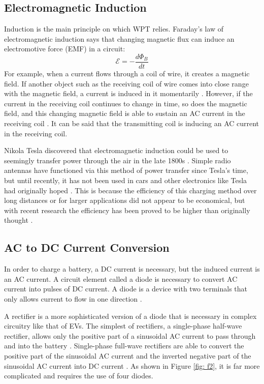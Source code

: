 \subsection{Electromagnetic Induction}
Induction is the main principle on which WPT relies. Faraday’s law of electromagnetic induction says that changing 
magnetic flux can induce an electromotive force (EMF) in a circuit:
\begin{equation}
    \mathcal{E} = -\frac{d\Phi_B}{dt}
\end{equation}
For example, when a current flows through a coil of wire, it creates a magnetic field.  If another object such as 
the receiving coil of wire comes into close range with the magnetic field, a current is induced in it momentarily 
\cite{young_university_2016}. However, if the current in the receiving coil continues to change in time, so does 
the magnetic field, and this changing magnetic field is able to sustain an AC current in the receiving coil 
\cite{young_university_2016}. It can be said that the transmitting coil is inducing an AC current in the receiving coil.  

Nikola Tesla discovered that electromagnetic induction could be used to seemingly transfer power through the air 
in the late 1800s \cite{lu_wireless_2016}.  Simple radio antennas have functioned via this method 
of power transfer since Tesla’s time, but until recently, it has not been used in cars and other electronics 
like Tesla had originally hoped \cite{lumpkins_nikola_2014}.  This is because the efficiency of this charging method over 
long distances or for larger applications did not appear to be economical, but with recent research the efficiency 
has been proved to be higher than originally thought \cite{lu_wireless_2016}.  

\subsection{AC to DC Current Conversion}
In order to charge a battery, a DC current is necessary, but the induced current is an AC current. 
A circuit element called a diode is necessary to convert AC current into pulses of DC current. 
A diode is a device with two terminals that only allows current to flow in one direction \cite{young_university_2016}. 

A rectifier is a more sophisticated version of a diode that is necessary in complex circuitry like that of EVs. 
The simplest of rectifiers, a single-phase half-wave rectifier, allows only the positive part of a sinusoidal AC 
current to pass through and into the battery \cite{skvarenina_power_2001}.  Single-phase full-wave rectifiers are able to 
convert the positive part of the sinusoidal AC current and the inverted negative part of the sinusoidal AC current 
into DC current \cite{skvarenina_power_2001}.  As shown in Figure \ref{fig: f2}, it is far more complicated and requires the use of four 
diodes. 

